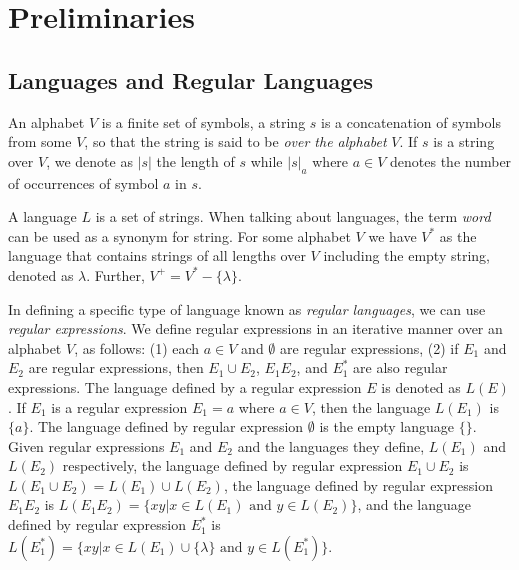 \documentclass[smallextended]{svjour3}
\begin{document}

\section{Preliminaries} \label{sec-prelims}

\subsection{Languages and Regular Languages} \label{sec-lang-reg}

An alphabet $V$ is a finite set of symbols, a string $s$ is a concatenation of symbols from some $V$, so that the string is said to be \textit{over
the alphabet} $V$. If $s$ is a string over $V$, we denote as $|s|$ the length of $s$ while $|s|_a$ where $a \in V$ denotes the number of occurrences 
of symbol $a$ in $s$. 
  
A language $L$ is a set of strings. When talking about languages, the term \textit{word} can be
used as a synonym for string. For some alphabet $V$ we have $V^*$ as the language that contains
strings of all lengths over $V$ including the empty string, denoted as $\lambda$. Further, 
$V^+ = V^* - \{\lambda\}$. 

In defining a specific type of language known as \textit{regular languages}, we can use
\textit{regular expressions}. We define regular expressions in an iterative manner over an alphabet
$V$, as follows: (1) each $a \in V$ and $\emptyset$ are regular expressions, (2) if $E_1$ and $E_2$ are regular expressions, then $E_1 \cup E_2$,
$E_1 E_2$, and $E_1^*$ are also regular expressions. The language defined by a regular expression $E$ is denoted as $L(E)$. If $E_1$ is a regular
expression $E_1 = a$ where  $a \in V$, then the language $L(E_1)$ is $\{a\}$. The language defined by regular expression $\emptyset$ is the empty
language $\{\}$. Given regular expressions $E_1$ and $E_2$ and the languages they define, $L(E_1)$ and $L(E_2)$ respectively, the language
defined by regular expression $E_1 \cup E_2$ is  $L(E_1 \cup E_2) =L(E_1) \cup L(E_2)$, the language defined by regular expression $E_1 E_2$
is $L(E_1 E_2) = \{xy|x \in L(E_1) \text{ and } y \in L(E_2) \}$, and the language defined by regular expression $E_1^*$ is $L(E_1^*) = \{xy|
x \in L(E_1) \cup \{\lambda\} \text{ and } y \in L(E_1^*)\}$. 

\end{document}
